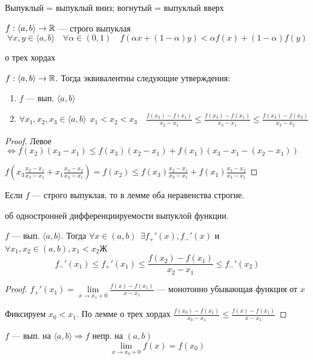 Выпуклый = выпуклый вниз; вогнутый = выпуклый вверх

\begin{definition}
    $f:\langle a,b\rangle\to\mathbb{R}$ --- строго выпуклая
    $$\forall x,y\in\langle a,b\rangle \quad \forall \alpha\in(0,1) \quad f(\alpha x + (1-\alpha)y)< \alpha f(x) + (1-\alpha)f(y)$$
\end{definition}

\begin{lemma}
    о трех хордах

    $f:\langle a,b\rangle\to\mathbb{R}$. Тогда эквивалентны следующие утверждения:
    \begin{enumerate}
        \item $f$ --- вып. $\langle a,b\rangle$
        \item $\forall x_1,x_2,x_3\in\langle a,b\rangle \ \ x_1<x_2<x_3 \quad \frac{f(x_2)-f(x_1)}{x_2-x_1}\leq\frac{f(x_3)-f(x_1)}{x_3-x_1}\leq\frac{f(x_3)-f(x_2)}{x_3-x_2}$
    \end{enumerate}
\end{lemma}
\begin{proof}
    Левое $\Leftrightarrow f(x_2)(x_3-x_1)\leq f(x_3)(x_2-x_1)+f(x_1)(x_3-x_1-(x_2-x_1))$

    $f(x_3\frac{x_2-x_1}{x_3-x_1}+x_1\frac{x_3-x_2}{x_3-x_1})=f(x_2)\leq f(x_3)\frac{x_2-x_1}{x_3-x_1}+f(x_1)\frac{x_3-x_2}{x_3-x_1}$
\end{proof}
\begin{remark}
    Если $f$ --- строго выпуклая, то в лемме оба неравенства строгие.
\end{remark}

\begin{theorem}
    об одностронней дифференциируемости выпуклой функции.

    $f$ --- вып. $\langle a,b\rangle$. Тогда $\forall x\in(a,b) \ \ \exists f_+'(x), f_-'(x)$ и $\forall x_1, x_2\in(a,b), x_1<x_2$Ж
    $$f_-'(x_1)\leq f_+'(x_1)\leq \frac{f(x_2)-f(x_1)}{x_2-x_1}\leq f_-'(x_2)$$
\end{theorem}
\begin{proof}
    $f_+'(x_1)=\lim\limits_{x\to x_1+0}\frac{f(x)-f(x_1)}{x-x_1}$ --- монотонно убывающая функция от $x$

    Фиксируем $x_0<x_1$. По лемме о трех хордах $\frac{f(x_0)-f(x_1)}{x_0-x_1}\leq\frac{f(x)-f(x_1)}{x-x_1}$
\end{proof}

\begin{consequence}
    $f$ --- вып. на $\langle a,b\rangle \Rightarrow f$ непр. на $(a,b)$
    $$\lim\limits_{x\to x_0+0}f(x)=f(x_0)$$
\end{consequence}

